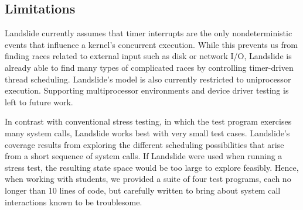 %

\subsection{Limitations}

Landslide currently assumes that timer interrupts are the only nondeterministic events that influence a kernel's concurrent execution. While this prevents us from finding races related to external input such as disk or network I/O, Landslide is already able to find many types of complicated races by controlling timer-driven thread scheduling.
Landslide's model is also currently restricted to uniprocessor execution.
Supporting multiprocessor environments and device driver testing is left to future work.

In contrast with conventional stress testing, in which the test program exercises many system calls, Landslide works best with very small test cases.
Landslide's coverage results from exploring the different scheduling possibilities that arise from a short sequence of system calls.
If Landslide were used when running a stress test, the resulting state space would be too large to explore feasibly.
Hence, when working with students, we provided a suite of four test programs, each no longer than 10 lines of code, but carefully written to bring about system call interactions known to be troublesome.

